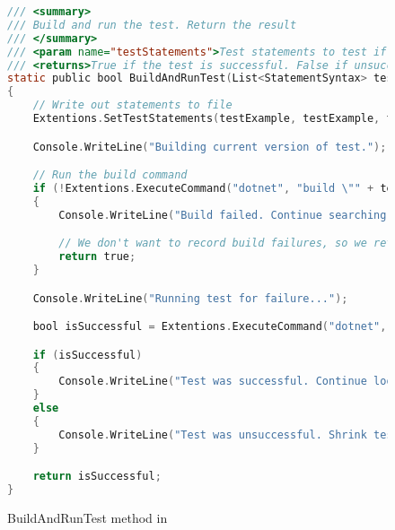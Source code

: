 \label{BuildAndRun Method}
\vspace{-7mm}

\begin{figure}
\begin{lstlisting}[language=C]
/// <summary>
/// Build and run the test. Return the result
/// </summary>
/// <param name="testStatements">Test statements to test if successful</param>
/// <returns>True if the test is successful. False if unsuccessful</returns>
static public bool BuildAndRunTest(List<StatementSyntax> testStatements)
{
	// Write out statements to file
	Extentions.SetTestStatements(testExample, testExample, testName, testStatements);

	Console.WriteLine("Building current version of test.");

	// Run the build command
	if (!Extentions.ExecuteCommand("dotnet", "build \"" + testProj + "\""))
	{
		Console.WriteLine("Build failed. Continue searching for failing test.");

		// We don't want to record build failures, so we return true to not remember them in the algorithm
		return true;
	}

	Console.WriteLine("Running test for failure...");

	bool isSuccessful = Extentions.ExecuteCommand("dotnet", "test \"" + testProj + "\" --filter \"FullyQualifiedName=" + Extentions.GetTestCallString(testExample, testName) + "\"");

	if (isSuccessful)
	{
		Console.WriteLine("Test was successful. Continue looking for failing test.");
	}
	else
	{
		Console.WriteLine("Test was unsuccessful. Shrink test statements.");
	}

	return isSuccessful;
}
\end{lstlisting}
\caption{BuildAndRunTest method in \mytool}
\label{fig:BuildAndRunTest1}
\end{figure}
